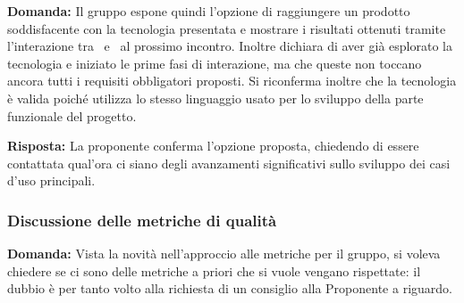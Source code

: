 \par \textbf{Domanda:} Il gruppo espone quindi l'opzione di raggiungere un prodotto soddisfacente con la tecnologia presentata e mostrare i risultati ottenuti tramite l'interazione tra \ e \ al prossimo incontro. 
Inoltre dichiara di aver già esplorato la tecnologia e iniziato le prime fasi di interazione, ma che queste non toccano ancora tutti i requisiti obbligatori proposti. 
Si riconferma inoltre che la tecnologia è valida poiché utilizza lo stesso linguaggio usato per lo sviluppo della parte funzionale del progetto.

\par \textbf{Risposta:} La proponente conferma l'opzione proposta, chiedendo di essere contattata qual'ora ci siano degli avanzamenti significativi sullo sviluppo dei casi d'uso principali.

\subsubsection{Discussione delle metriche di qualità}

\par \textbf{Domanda:} Vista la novità nell'approccio alle metriche per il gruppo, si voleva chiedere se ci sono delle metriche a priori che si vuole vengano rispettate: il dubbio è per tanto volto alla richiesta di un consiglio alla Proponente a riguardo.
